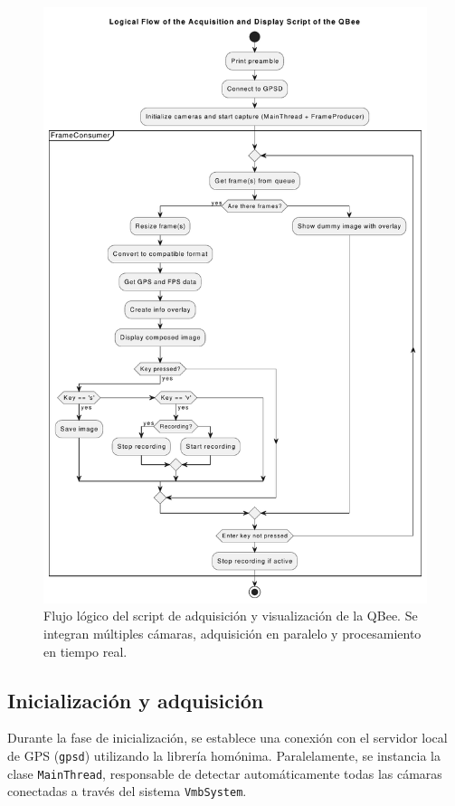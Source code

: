     \begin{figure}[!h]
        \centering
        \includegraphics[trim = 0 0 0 1cm, clip, width=1\textwidth]{Figures/C4/OSU_main.pdf}
        \caption{Flujo lógico del script de adquisición y visualización de la QBee. Se integran múltiples cámaras, adquisición en paralelo y procesamiento en tiempo real.}
        \label{fig:diagrama_script}
    \end{figure}
    
    \subsection{Inicialización y adquisición}
    
    Durante la fase de inicialización, se establece una conexión con el servidor local de GPS (\texttt{gpsd}) utilizando la librería homónima. Paralelamente, se instancia la clase \texttt{MainThread}, responsable de detectar automáticamente todas las cámaras conectadas a través del sistema \texttt{VmbSystem}.\\
    

